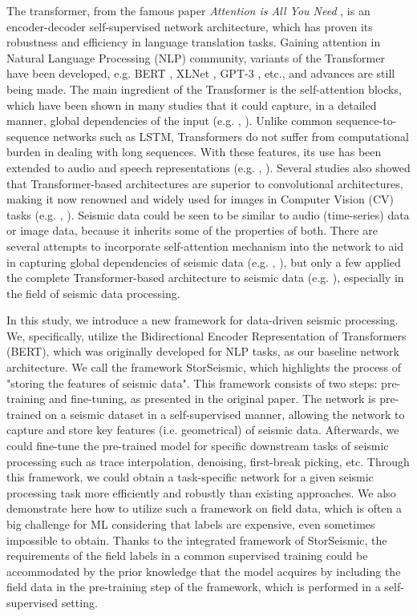 \documentclass{article}
\begin{document}
The transformer, from the famous paper \textit{Attention is All You Need} \cite{vaswani2017attention}, is an encoder-decoder self-supervised network architecture, which has proven its robustness and efficiency in language translation tasks. Gaining attention in Natural Language Processing (NLP) community, variants of the Transformer have been developed, e.g. BERT \cite{devlin2018bert}, XLNet \cite{yang2019xlnet}, GPT-3 \cite{brown2020language}, etc., and advances are still being made. The main ingredient of the Transformer is the self-attention blocks, which have been shown in many studies that it could capture, in a detailed manner, global dependencies of the input (e.g. \cite{vaswani2017attention}, \cite{yu2021attention}). Unlike common sequence-to-sequence networks such as LSTM, Transformers do not suffer from computational burden in dealing with long sequences. With these features, its use has been extended to audio and speech representations (e.g. \cite{liu2020mockingjay}, \cite{chi2021audio}). Several studies also showed that Transformer-based architectures are superior to convolutional architectures, making it now renowned and widely used for images in Computer Vision (CV) tasks (e.g. \cite{dosovitskiy2020image}, \cite{he2021masked}). Seismic data could be seen to be similar to audio (time-series) data or image data, because it inherits some of the properties of both. There are several attempts to incorporate self-attention mechanism into the network to aid in capturing global dependencies of seismic data (e.g. \cite{saad2021self}, \cite{yu2021attention}), but only a few applied the complete Transformer-based architecture to seismic data (e.g. \cite{mousavi2020earthquake}), especially in the field of seismic data processing.

In this study, we introduce a new framework for data-driven seismic processing. We, specifically, utilize the Bidirectional Encoder Representation of Transformers (BERT), which was originally developed for NLP tasks, as our baseline network architecture. We call the framework StorSeismic, which highlights the process of "storing the features of seismic data". This framework consists of two steps: pre-training and fine-tuning, as presented in the original paper. The network is pre-trained on a seismic dataset in a self-supervised manner, allowing the network to capture and store key features (i.e. geometrical) of seismic data. Afterwards, we could fine-tune the pre-trained model for specific downstream tasks of seismic processing such as trace interpolation, denoising, first-break picking, etc. Through this framework, we could obtain a task-specific network for a given seismic processing task more efficiently and robustly than existing approaches. We also demonstrate here how to utilize such a framework on field data, which is often a big challenge for ML considering that labels are expensive, even sometimes impossible to obtain. Thanks to the integrated framework of StorSeismic, the requirements of the field labels in a common supervised training could be accommodated by the prior knowledge that the model acquires by including the field data in the pre-training step of the framework, which is performed in a self-supervised setting. 
\end{document}
